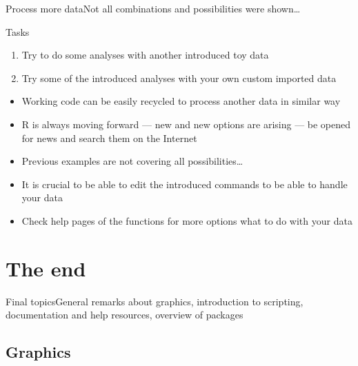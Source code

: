 \documentclass[compress, ucs, xelatex, 11pt, xcolor=svgnames,
  hyperref={
    bookmarks=true,
    unicode=true,
    colorlinks=true,
    pdftitle={Molecular data in R},
    plainpages=false,
    pdfauthor={Vojtech Zeisek},
    pdfsubject={Course about phylogeny and evolution in R},
    pdfcreator={XeLaTeX},
    pdfkeywords={R, evolution, phylogeny, molecular data},
    linkcolor=Tomato,
    anchorcolor=SaddleBrown,
    citecolor=Goldenrod,
    filecolor=DarkMagenta,
    menucolor=Sienna,
    urlcolor=DarkTurquoise,
    pdftex},
  url={hyphens, lowtilde} %
  ]{beamer}
\begin{document}
\begin{frame}{Process more data}{Not all combinations and possibilities were shown\ldots}
  \begin{block}{Tasks}
    \begin{enumerate}
      \item Try to do some analyses with another introduced toy data
      \item Try some of the introduced analyses with your own custom imported data
    \end{enumerate}
  \end{block}
  \begin{itemize}
    \item Working code can be easily recycled to process another data in similar way
    \item R is always moving forward --- new and new options are arising --- be opened for news and search them on the Internet
    \item Previous examples are not covering all possibilities\ldots
    \item It is crucial to be able to edit the introduced commands to be able to handle your data
    \item Check help pages of the functions for more options what to do with your data
  \end{itemize}
\end{frame}

\section{The end}

\begin{frame}{Final topics}{General remarks about graphics, introduction to scripting, documentation and help resources, overview of packages}
  \tableofcontents[currentsection, sectionstyle=show/hide, hideothersubsections]
\end{frame}

\subsection{Graphics}
\end{document}
